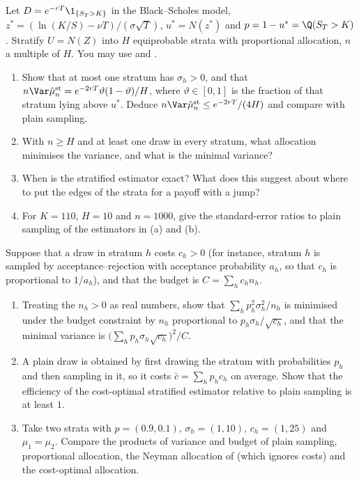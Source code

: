 
\begin{exercise}\label{ex:st-digital}
\easy Let $D=e^{-rT}\1_{\{S_T>K\}}$ in the Black--Scholes model, $z^*=(\ln(K/S)-\nu T)/(\sigma\sqrt T)$,
$u^*=N(z^*)$ and $p=1-u^*=\Q(S_T>K)$. Stratify $U=N(Z)$ into $H$ equiprobable strata with
proportional allocation, $n$ a multiple of $H$. You may use  and
.
\begin{enumerate}[label=(\alph*)]
  \item Show that at most one stratum has $\sigma_h>0$, and that
    $n\Var\hat\mu^{\mathrm{st}}_n=e^{-2rT}\vartheta(1-\vartheta)/H$, where $\vartheta\in[0,1]$
    is the fraction of that stratum lying above $u^*$. Deduce
    $n\Var\hat\mu^{\mathrm{st}}_n\le e^{-2rT}/(4H)$ and compare with plain sampling.
  \item With $n\ge H$ and at least one draw in every stratum, what allocation minimises the
    variance, and what is the minimal variance?
  \item When is the stratified estimator exact? What does this suggest about where to put the
    edges of the strata for a payoff with a jump?
  \item For $K=110$, $H=10$ and $n=1000$, give the standard-error ratios to plain sampling of
    the estimators in (a) and (b).
\end{enumerate}
\end{exercise}

\begin{exercise}\label{ex:st-costs}
\easy Suppose that a draw in stratum $h$ costs $c_h>0$ (for instance, stratum $h$ is sampled
by acceptance--rejection with acceptance probability $a_h$, so that $c_h$ is proportional to
$1/a_h$), and that the budget is $C=\sum_hc_hn_h$.
\begin{enumerate}[label=(\alph*)]
  \item Treating the $n_h>0$ as real numbers, show that $\sum_hp_h^2\sigma_h^2/n_h$ is
    minimised under the budget constraint by $n_h$ proportional to $p_h\sigma_h/\sqrt{c_h}$,
    and that the minimal variance is $\big(\sum_hp_h\sigma_h\sqrt{c_h}\big)^2/C$.
  \item A plain draw is obtained by first drawing the stratum with probabilities $p_h$ and then
    sampling in it, so it costs $\bar c=\sum_hp_hc_h$ on average. Show that the efficiency of
    the cost-optimal stratified estimator relative to plain sampling is at least $1$.
  \item Take two strata with $p=(0.9,0.1)$, $\sigma_h=(1,10)$, $c_h=(1,25)$ and $\mu_1=\mu_2$.
    Compare the products of variance and budget of plain sampling, proportional allocation,
    the Neyman allocation of  (which ignores costs) and the
    cost-optimal allocation.
\end{enumerate}
\end{exercise}

